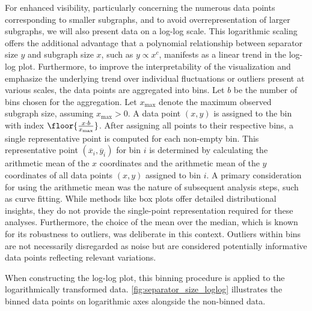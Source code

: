 For enhanced visibility, particularly concerning the numerous data points corresponding to smaller subgraphs, and to avoid overrepresentation of larger subgraphs, we will also present data on a log-log scale.
This logarithmic scaling offers the additional advantage that a polynomial relationship between separator size \( y \) and subgraph size \( x \), such as \( y \propto x^c \), manifests as a linear trend in the log-log plot.
Furthermore, to improve the interpretability of the visualization and emphasize the underlying trend over individual fluctuations or outliers present at various scales, the data points are aggregated into bins.
Let \( b \) be the number of bins chosen for the aggregation.
Let \( x_{\max} \) denote the maximum observed subgraph size, assuming \( x_{\max} > 0 \).
A data point \( (x, y) \) is assigned to the bin with index \( \floor{\frac{x \cdot b}{x_{\max}}} \).
After assigning all points to their respective bins, a single representative point is computed for each non-empty bin.
This representative point \( (\overline{x}_i, \overline{y}_i) \) for bin \( i \) is determined by calculating the arithmetic mean of the \( x \) coordinates and the arithmetic mean of the \( y \) coordinates of all data points \( (x, y) \) assigned to bin \( i \).
A primary consideration for using the arithmetic mean was the nature of subsequent analysis steps, such as curve fitting.
While methods like box plots offer detailed distributional insights, they do not provide the single-point representation required for these analyses.
Furthermore, the choice of the mean over the median, which is known for its robustness to outliers, was deliberate in this context.
Outliers within bins are not necessarily disregarded as noise but are considered potentially informative data points reflecting relevant variations.

When constructing the log-log plot, this binning procedure is applied to the logarithmically transformed data.
\cref{fig:separator_size_loglog} illustrates the binned data points on logarithmic axes alongside the non-binned data.

